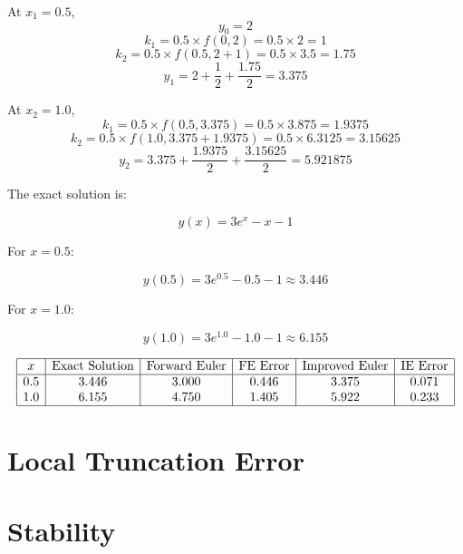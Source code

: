 \documentclass{article}
\begin{document}
At \( x_1 = 0.5 \),
$$ y_0 = 2 $$
$$ k_1 = 0.5\times f(0,2) = 0.5\times  2 = 1 $$
$$ k_2 = 0.5\times f(0.5, 2 + 1) = 0.5\times 3.5 = 1.75 $$
$$ y_1 = 2 + \frac{1}{2}+ \frac{1.75}{2}= 3.375 $$

At \( x_2 = 1.0 \),
$$ k_1 = 0.5\times f(0.5, 3.375) = 0.5 \times 3.875 = 1.9375 $$
$$ k_2 = 0.5 \times f(1.0, 3.375 + 1.9375) = 0.5 \times 6.3125 = 3.15625 $$
$$ y_2 = 3.375 + \frac{1.9375}{2} + \frac{3.15625}{2}=5.921875 $$

The exact solution is:

$$
    y(x) = 3e^x - x - 1
$$

For \( x = 0.5 \):

$$
    y(0.5) = 3e^{0.5} - 0.5 - 1 \approx 3.446
$$

For \( x = 1.0 \):

$$
    y(1.0) = 3e^{1.0} - 1.0 - 1 \approx 6.155
$$

$$
    \begin{array}{|c|c|c|c|c|c|}
        \hline
        x   & \text{Exact Solution} & \text{Forward Euler} & \text{FE Error} & \text{Improved Euler} & \text{IE Error} \\
        \hline
        0.5 & 3.446                 & 3.000                & 0.446           & 3.375                 & 0.071           \\
        1.0 & 6.155                 & 4.750                & 1.405           & 5.922                 & 0.233           \\
        \hline
    \end{array}
$$

\newpage
\section{Local Truncation Error}

\newpage
\section{Stability}
\end{document}
